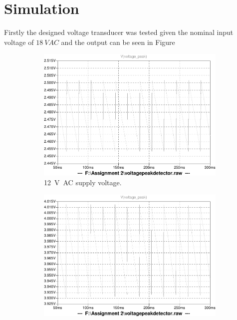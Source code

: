\section{Simulation} \label{sec:simulation_voltage_peak_transducer}
Firstly the designed voltage transducer was tested given the nominal input voltage of $\SI{18}{VAC}$ and the output can be seen in Figure 

\begin{figure}
 \centering
     \begin{subfigure}[]{0.45\textwidth}
        \centering
         \includegraphics[width=1\linewidth]{./Figures/voltagetransducer12vsim.pdf}
		    \caption{\SI{12}{\volt AC} supply voltage.} \label{subfig:AC}
     \end{subfigure}
      \begin{subfigure}[]{0.45\textwidth}
              \centering
  		\includegraphics[width=1\linewidth]{./Figures/voltagetransducer20vsim.pdf}

\end{subfigure}
\end{figure}
